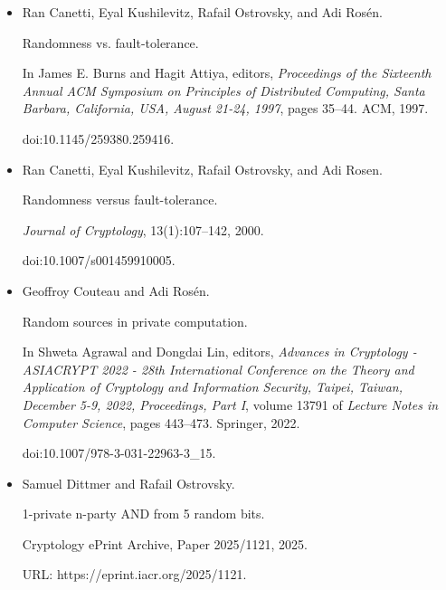 \documentclass[10pt,a4paper]{article}
\begin{document}
\begin{itemize}


\item[] 
[1]

Ran Canetti, Eyal Kushilevitz, Rafail Ostrovsky, and Adi Rosén.


Randomness vs. fault-tolerance.


In James E. Burns and Hagit Attiya, editors, \emph{Proceedings of the
Sixteenth Annual ACM Symposium on Principles of Distributed Computing,
Santa Barbara, California, USA, August 21-24, 1997}, pages 35–44. ACM,
1997.


doi:10.1145/259380.259416.





\item[] 
[2]

Ran Canetti, Eyal Kushilevitz, Rafail Ostrovsky, and Adi Rosen.


Randomness versus fault-tolerance.


\emph{Journal of Cryptology}, 13(1):107–142, 2000.


doi:10.1007/s001459910005.





\item[] 
[3]

Geoffroy Couteau and Adi Rosén.


Random sources in private computation.


In Shweta Agrawal and Dongdai Lin, editors, \emph{Advances in
Cryptology - ASIACRYPT 2022 - 28th International Conference on the Theory
and Application of Cryptology and Information Security, Taipei, Taiwan,
December 5-9, 2022, Proceedings, Part I}, volume 13791 of \emph{Lecture
Notes in Computer Science}, pages 443–473. Springer, 2022.


doi:10.1007/978-3-031-22963-3\_15.





\item[] 
[4]

Samuel Dittmer and Rafail Ostrovsky.


1-private n-party AND from 5 random bits.


Cryptology ePrint Archive, Paper 2025/1121, 2025.


URL: https://eprint.iacr.org/2025/1121.






\end{itemize}
\end{document}
